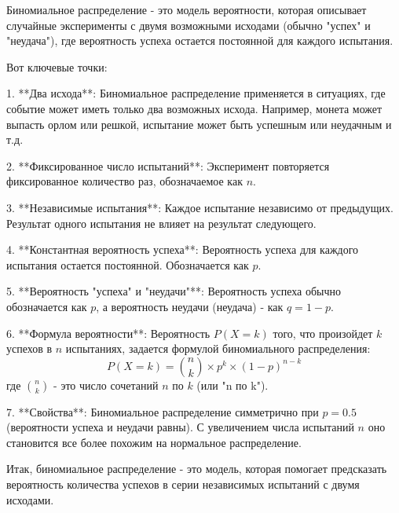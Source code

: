 Биномиальное распределение - это модель вероятности, которая описывает случайные эксперименты с двумя возможными исходами (обычно "успех" и "неудача"), где вероятность успеха остается постоянной для каждого испытания.

Вот ключевые точки:

1. **Два исхода**: Биномиальное распределение применяется в ситуациях, где событие может иметь только два возможных исхода. Например, монета может выпасть орлом или решкой, испытание может быть успешным или неудачным и т.д.

2. **Фиксированное число испытаний**: Эксперимент повторяется фиксированное количество раз, обозначаемое как \( n \).

3. **Независимые испытания**: Каждое испытание независимо от предыдущих. Результат одного испытания не влияет на результат следующего.

4. **Константная вероятность успеха**: Вероятность успеха для каждого испытания остается постоянной. Обозначается как \( p \).

5. **Вероятность "успеха" и "неудачи"**: Вероятность успеха обычно обозначается как \( p \), а вероятность неудачи (неудача) - как \( q = 1 - p \).

6. **Формула вероятности**: Вероятность \( P(X = k) \) того, что произойдет \( k \) успехов в \( n \) испытаниях, задается формулой биномиального распределения:
\[ P(X = k) = \binom{n}{k} \times p^k \times (1 - p)^{n - k} \]
где \( \binom{n}{k} \) - это число сочетаний \( n \) по \( k \) (или "n по k").

7. **Свойства**: Биномиальное распределение симметрично при \( p = 0.5 \) (вероятности успеха и неудачи равны). С увеличением числа испытаний \( n \) оно становится все более похожим на нормальное распределение.

Итак, биномиальное распределение - это модель, которая помогает предсказать вероятность количества успехов в серии независимых испытаний с двумя исходами.
